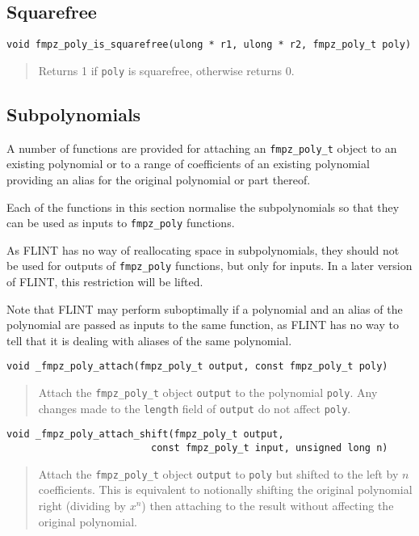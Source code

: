 \documentclass[a4paper,10pt]{article}
\newcommand{\code}{\lstinline}
\begin{document}
\subsection{Squarefree}

\begin{lstlisting}
void fmpz_poly_is_squarefree(ulong * r1, ulong * r2, fmpz_poly_t poly)
\end{lstlisting}
\begin{quote}
Returns 1 if \code{poly} is squarefree, otherwise returns 0.
\end{quote}

\subsection{Subpolynomials}
A number of functions are provided for attaching an \code{fmpz_poly_t} object to an existing polynomial or to a range of coefficients of an existing polynomial providing an alias for the original polynomial or part thereof. 

Each of the functions in this section normalise the subpolynomials so that they can be used as inputs to \code{fmpz_poly} functions. 

As FLINT has no way of reallocating space in subpolynomials, they should not be used for outputs of \code{fmpz_poly} functions, but only for inputs. In a later version of FLINT, this restriction will be lifted.

Note that FLINT may perform suboptimally if a polynomial and an alias of the polynomial are passed as inputs to the same function, as FLINT has no way to tell that it is dealing with aliases of the same polynomial.

\begin{lstlisting}
void _fmpz_poly_attach(fmpz_poly_t output, const fmpz_poly_t poly)
\end{lstlisting}
\begin{quote}
Attach the \code{fmpz_poly_t} object \code{output} to the polynomial \code{poly}. Any changes made to the \code{length} field of \code{output} do not affect \code{poly}.
\end{quote}

\begin{lstlisting}
void _fmpz_poly_attach_shift(fmpz_poly_t output, 
                         const fmpz_poly_t input, unsigned long n)
\end{lstlisting}
\begin{quote}
Attach the \code{fmpz_poly_t} object \code{output} to \code{poly} but shifted to the left by $n$ coefficients. This is equivalent to notionally shifting the original polynomial right (dividing by $x^n$) then attaching to the result without affecting the original polynomial.
\end{quote}
\end{document}
